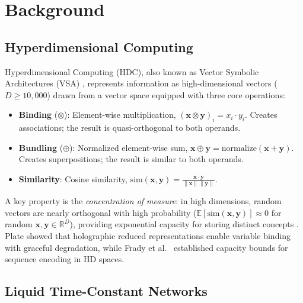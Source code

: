 \documentclass{article}
\newcommand{\bind}{\otimes}
\newcommand{\bundle}{\oplus}
\newcommand{\R}{\mathbb{R}}
\newcommand{\E}{\mathbb{E}}
\newcommand{\hvx}{\mathbf{x}}
\begin{document}
\section{Background}
\label{sec:background}

\subsection{Hyperdimensional Computing}

Hyperdimensional Computing (HDC), also known as Vector Symbolic Architectures (VSA) \cite{kanerva2009hyperdimensional,gayler2003vector,schlegel2022comparison}, represents information as high-dimensional vectors ($D \geq 10{,}000$) drawn from a vector space equipped with three core operations:

\begin{itemize}
    \item \textbf{Binding} ($\bind$): Element-wise multiplication, $(\hvx \bind \mathbf{y})_i = x_i \cdot y_i$. Creates associations; the result is quasi-orthogonal to both operands.
    \item \textbf{Bundling} ($\bundle$): Normalized element-wise sum, $\hvx \bundle \mathbf{y} = \text{normalize}(\hvx + \mathbf{y})$. Creates superpositions; the result is similar to both operands.
    \item \textbf{Similarity}: Cosine similarity, $\text{sim}(\hvx, \mathbf{y}) = \frac{\hvx \cdot \mathbf{y}}{\|\hvx\| \|\mathbf{y}\|}$.
\end{itemize}

A key property is the \emph{concentration of measure}: in high dimensions, random vectors are nearly orthogonal with high probability ($\E[\text{sim}(\hvx, \mathbf{y})] \approx 0$ for random $\hvx, \mathbf{y} \in \R^D$), providing exponential capacity for storing distinct concepts \cite{thomas2021theoretical}. Plate \cite{plate2003holographic} showed that holographic reduced representations enable variable binding with graceful degradation, while Frady et al.~\cite{frady2018theory} established capacity bounds for sequence encoding in HD spaces.

\subsection{Liquid Time-Constant Networks}
\end{document}
